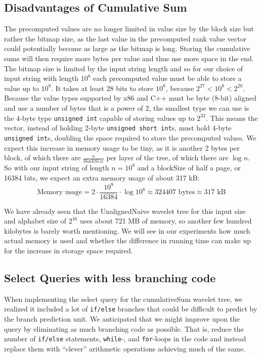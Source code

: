 \subsection{Disadvantages of Cumulative Sum}
The precomputed values are no longer limited in value size by the block size but rather the bitmap size, as the last value in the precomputed rank value vector could potentially become as large as the bitmap is long.
Storing the cumulative sums will then require more bytes per value and thus use more space in the end.
The bitmap size is limited by the input string length and so for our choice of input string with length $10^8$ each precomputed value must be able to store a value up to $10^8$.
It takes at least 28 bits to store $10^8$, because $2^{27} < 10^8 < 2^{28}$.
Because the value types supported by x86 and C++ must be byte (8-bit) aligned and use a number of bytes that is a power of 2, the smallest type we can use is the 4-byte type \texttt{unsigned int} capable of storing values up to $2^{32}$.
This means the vector, instead of holding 2-byte \texttt{unsigned short int}s, must hold 4-byte \texttt{unsigned int}s, doubling the space required to store the precomputed values.
We expect this increase in memory usage to be tiny, as it is another 2 bytes per block, of which there are $\frac{n}{\mathit{blockSize}}$ per layer of the tree, of which there are $\log n$.
So with our input string of length $n = 10^8$ and a blockSize of half a page, or 16384 bits, we expect an extra memory usage of about 317 kB:
\[\text{Memory usage} = 2 \cdot \frac{10^8}{16384} \cdot \log 10^8 \approx 324407 \text{ bytes} \approx 317 \text{ kB} \]

We have already seen that the UnalignedNaive wavelet tree for this input size and alphabet size of $2^{16}$ uses about 721 MB of memory, so another few hundred kilobytes is barely worth mentioning.
We will see in our experiments how much actual memory is used and whether the difference in running time can make up for the increase in storage space required.

\subsection{Select Queries with less branching code}
When implementing the select query for the cumulativeSum wavelet tree, we realized it included a lot of \texttt{if/else} branches that could be difficult to predict by the branch prediction unit.
We anticipated that we might improve upon the query by eliminating as much branching code as possible.
That is, reduce the number of \texttt{if/else} statements, \texttt{while}-, and \texttt{for}-loops in the code and instead replace them with “clever” arithmetic operations achieving much of the same.

